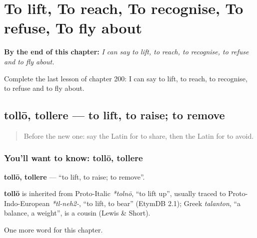 
\chapter{To lift, To reach, To recognise, To refuse, To fly about}
\label{ch:la-to-lift-to-reach-to-recognise-to-refuse-to-fly-about}

\begin{chapteropening}
\textbf{By the end of this chapter:} \emph{I can say to lift, to reach, to recognise, to refuse and to fly about.}

Complete the last lesson of chapter 200: I can say to lift, to reach, to recognise, to refuse and to fly about.
\end{chapteropening}

\section[tollō, tollere]{tollō, tollere — to lift, to raise; to remove}

\label{lesson:LA-C200-tollo}



\begin{quote}
Before the new one: say the Latin for to share, then the Latin for to avoid.
\end{quote}

\subsection*{You'll want to know: tollō, tollere}
\textbf{tollō, tollere} — \textquotedblleft{}to lift, to raise; to remove\textquotedblright{}.

\begin{cousinweb}
\textbf{tollō} is inherited from Proto-Italic \emph{*tolnō}, \textquotedblleft{}to lift up\textquotedblright{}, usually traced to Proto-Indo-European \emph{*tl-neh2-}, \textquotedblleft{}to lift, to bear\textquotedblright{} (EtymDB 2.1); Greek \emph{talanton}, \textquotedblleft{}a balance, a weight\textquotedblright{}, is a cousin (Lewis \& Short).
\end{cousinweb}

\begin{grammarlens}[title={What you've built}]
One more word for this chapter.
\end{grammarlens}

